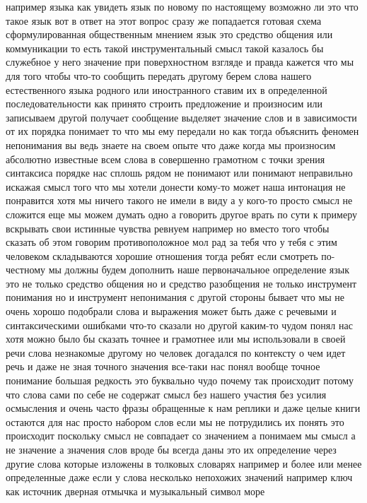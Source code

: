 например языка как увидеть язык по новому по настоящему возможно ли это что
такое язык вот в ответ на этот вопрос сразу же попадается готовая схема
сформулированная общественным мнением язык это средство общения или коммуникации
то есть такой инструментальный смысл такой казалось бы служебное у него значение
при поверхностном взгляде и правда кажется что мы для того чтобы что-то сообщить
передать другому берем слова нашего естественного языка родного или иностранного
ставим их в определенной последовательности как принято строить предложение и
произносим или записываем другой получает сообщение выделяет значение слов и в
зависимости от их порядка понимает то что мы ему передали но как тогда объяснить
феномен непонимания вы ведь знаете на своем опыте что даже когда мы произносим
абсолютно известные всем слова в совершенно грамотном с точки зрения синтаксиса
порядке нас сплошь рядом не понимают или понимают неправильно искажая смысл того
что мы хотели донести кому-то может наша интонация не понравится хотя мы ничего
такого не имели в виду а у кого-то просто смысл не сложится еще мы можем думать
одно а говорить другое врать по сути к примеру вскрывать свои истинные чувства
ревнуем например но вместо того чтобы сказать об этом говорим противоположное
мол рад за тебя что у тебя с этим человеком складываются хорошие отношения тогда
ребят если смотреть по-честному мы должны будем дополнить наше первоначальное
определение язык это не только средство общения но и средство разобщения не
только инструмент понимания но и инструмент непонимания с другой стороны бывает
что мы не очень хорошо подобрали слова и выражения может быть даже с речевыми и
синтаксическими ошибками что-то сказали но другой каким-то чудом понял нас хотя
можно было бы сказать точнее и грамотнее или мы использовали в своей речи слова
незнакомые другому но человек догадался по контексту о чем идет речь и даже не
зная точного значения все-таки нас понял вообще точное понимание большая
редкость это буквально чудо почему так происходит потому что слова сами по себе
не содержат смысл без нашего участия без усилия осмысления и очень часто фразы
обращенные к нам реплики и даже целые книги остаются для нас просто набором слов
если мы не потрудились их понять это происходит поскольку смысл не совпадает со
значением а понимаем мы смысл а не значение а значения слов вроде бы всегда даны
это их определение через другие слова которые изложены в толковых словарях
например и более или менее определенные даже если у слова несколько непохожих
значений например ключ как источник дверная отмычка и музыкальный символ море

